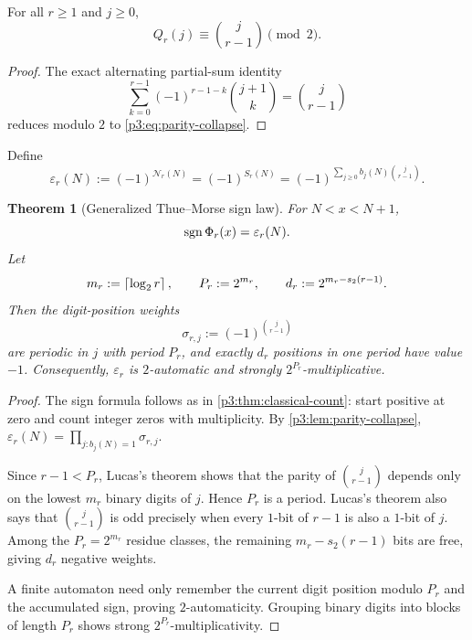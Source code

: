 \documentclass[11pt,oneside]{article}
\newtheorem{theorem}{Theorem}[section]
\theoremstyle{definition}
\theoremstyle{remark}
\begin{document}
\begin{lemma}\label{p3:lem:parity-collapse}
For all $r\ge1$ and $j\ge0$,
\begin{equation}\label{p3:eq:parity-collapse}
  Q_r(j)\equiv\binom j{r-1}\pmod2.
\end{equation}
\end{lemma}

\begin{proof}
The exact alternating partial-sum identity
\[
 \sum_{k=0}^{r-1}(-1)^{r-1-k}\binom{j+1}{k}=\binom j{r-1}
\]
reduces modulo $2$ to \eqref{p3:eq:parity-collapse}.
\end{proof}

\begin{definition}\label{p3:def:eps-r}
Define
\begin{equation}\label{p3:eq:eps-r}
 \varepsilon_r(N):=(-1)^{\mathcal N_r(N)}
 =(-1)^{S_r(N)}
 =(-1)^{\sum_{j\ge0}b_j(N)\binom j{r-1}}.
\end{equation}
\end{definition}

\begin{theorem}[Generalized Thue--Morse sign law]\label{p3:thm:sign-law-r}
For $N<x<N+1$,
\begin{equation}\label{p3:eq:sign-law-r}
  \operatorname{sgn}\Phi_r(x)=\varepsilon_r(N).
\end{equation}
Let
\begin{equation}\label{p3:eq:Pr-dr}
 m_r:=\left\lceil \log_2r\right\rceil,\qquad
 P_r:=2^{m_r},\qquad
 d_r:=2^{m_r-s_2(r-1)}.
\end{equation}
Then the digit-position weights
\begin{equation}\label{p3:eq:sigma-rj}
 \sigma_{r,j}:=(-1)^{\binom j{r-1}}
\end{equation}
are periodic in $j$ with period $P_r$, and exactly $d_r$ positions in one period have value $-1$.  Consequently, $\varepsilon_r$ is $2$-automatic and strongly $2^{P_r}$-multiplicative.
\end{theorem}

\begin{proof}
The sign formula follows as in \cref{p3:thm:classical-count}: start positive at zero and count integer zeros with multiplicity.  By \cref{p3:lem:parity-collapse},
$\varepsilon_r(N)=\prod_{j:b_j(N)=1}\sigma_{r,j}$.

Since $r-1<P_r$, Lucas's theorem shows that the parity of $\binom j{r-1}$ depends only on the lowest $m_r$ binary digits of $j$.  Hence $P_r$ is a period.  Lucas's theorem also says that $\binom j{r-1}$ is odd precisely when every $1$-bit of $r-1$ is also a $1$-bit of $j$.  Among the $P_r=2^{m_r}$ residue classes, the remaining $m_r-s_2(r-1)$ bits are free, giving $d_r$ negative weights.

A finite automaton need only remember the current digit position modulo $P_r$ and the accumulated sign, proving $2$-automaticity.  Grouping binary digits into blocks of length $P_r$ shows strong $2^{P_r}$-multiplicativity.
\end{proof}
\end{document}

